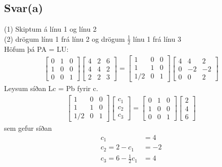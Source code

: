 \documentclass[11pt]{article}
\begin{document}
\subsection*{Svar(a)}
(1) Skiptum á línu 1 og línu 2\\
(2) drögum línu 1 frá línu 2 og drögum $\frac 12$ línu 1 frá línu 3\\
Höfum þá PA = LU:
\begin{align*}
\begin{bmatrix} %
0 & 1 & 0\\
1 & 0 & 0\\
0 & 0 & 1
\end{bmatrix}
\begin{bmatrix} %
4 & 2 & 6\\
4 & 4 & 2\\
2 & 2 & 3
\end{bmatrix}
=
\begin{bmatrix} %
1 & 0 & 0\\
1 & 1 & 0\\
1/2 & 0 & 1
\end{bmatrix}
\begin{bmatrix} %
4 & 4 & 2\\
0 & -2& -2\\
0 & 0 & 2
\end{bmatrix}
\end{align*}
Leysum síðan Lc = Pb fyrir c.
\begin{align*}
\begin{bmatrix} %
1 & 0 & 0\\
1 & 1 & 0\\
1/2 & 0 & 1
\end{bmatrix}
\begin{bmatrix}
c_1\\
c_2\\
c_3
\end{bmatrix}
=
\begin{bmatrix} %
0 & 1 & 0\\
1 & 0 & 0\\
0 & 0 & 1
\end{bmatrix}
\begin{bmatrix}
2\\
4\\
6
\end{bmatrix}
\end{align*}
sem gefur síðan
\begin{align*}
c_1 &= 4\\
c_2 = 2 - c_1 &= -2\\
c_3 = 6 - \frac 12 c_1 &= 4
\end{align*}
\end{document}
